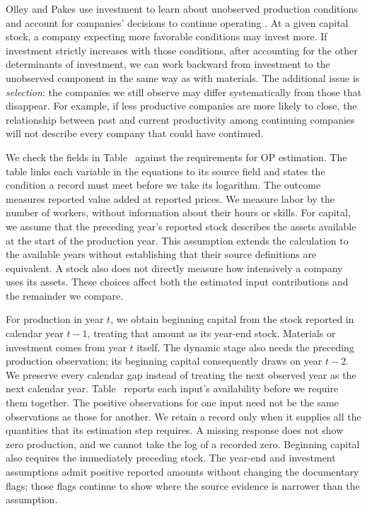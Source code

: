 Olley and Pakes use investment to learn about unobserved production conditions and account for companies' decisions to continue operating \citep{op}. At a given capital stock, a company expecting more favorable conditions may invest more. If investment strictly increases with those conditions, after accounting for the other determinants of investment, we can work backward from investment to the unobserved component in the same way as with materials. The additional issue is \emph{selection}: the companies we still observe may differ systematically from those that disappear. For example, if less productive companies are more likely to close, the relationship between past and current productivity among continuing companies will not describe every company that could have continued.

We check the fields in Table~ against the requirements for OP estimation. The table links each variable in the equations to its source field and states the condition a record must meet before we take its logarithm.
The outcome measures reported value added at reported prices. We measure labor by the number of workers, without information about their hours or skills. For capital, we assume that the preceding year's reported stock describes the assets available at the start of the production year. This assumption extends the calculation to the available years without establishing that their source definitions are equivalent. A stock also does not directly measure how intensively a company uses its assets. These choices affect both the estimated input contributions and the remainder we compare.

For production in year $t$, we obtain beginning capital from the stock reported in calendar year $t-1$, treating that amount as its year-end stock. Materials or investment comes from year $t$ itself. The dynamic stage also needs the preceding production observation; its beginning capital consequently draws on year $t-2$. We preserve every calendar gap instead of treating the next observed year as the next calendar year. Table~ reports each input's availability before we require them together.
The positive observations for one input need not be the same observations as those for another. We retain a record only when it supplies all the quantities that its estimation step requires. A missing response does not show zero production, and we cannot take the log of a recorded zero. Beginning capital also requires the immediately preceding stock. The year-end and investment assumptions admit positive reported amounts without changing the documentary flags; those flags continue to show where the source evidence is narrower than the assumption.

